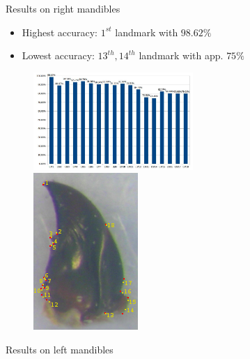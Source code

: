 \documentclass{LaBRI_poster}
\def\Put(#1,#2)#3{\leavevmode\makebox(0,0){\put(#1,#2){#3}}}
\begin{document}
\begin{frame}[t]
\begin{columns}[t]
\begin{column}{\twocolwidth}
\end{column}

\begin{column}{\sepwidth}\end{column}

\begin{column}{\twocolwidth}

\begin{block}{Results on right mandibles}
	\begin{itemize}
  		\item Highest accuracy: $1^{st}$ landmark with \textbf{$98.62\%$}
  		\item Lowest accuracy: $13^{th}, 14^{th}$ landmark with app. $75\%$
  	\end{itemize}
  	\begin{figure}[l]
		\includegraphics[width=0.6\textwidth]{images/md_chartlms}~~
		\includegraphics[scale=1.8]{images/md_rs}
	\end{figure}
  	
\end{block}

\begin{block}{Results on left mandibles}
	

\end{block}
\end{column}
\end{columns}
\end{frame}
\end{document}
